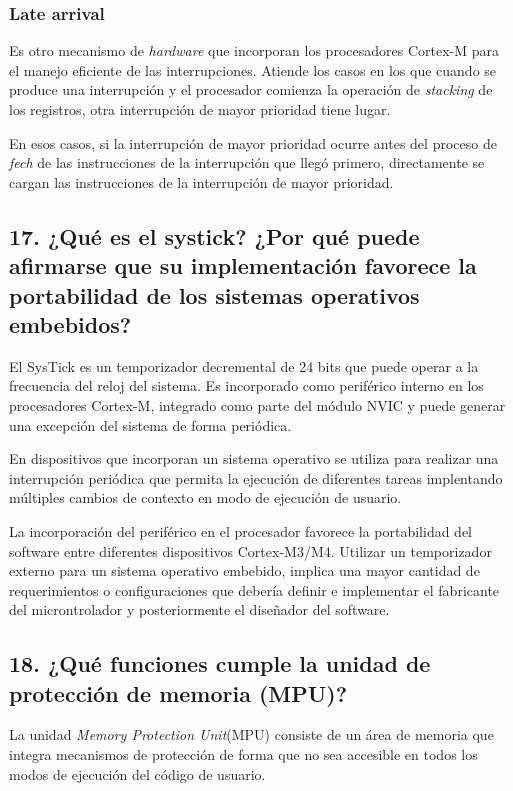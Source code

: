 \documentclass[10pt,a4paper,twoside,spanish]{article}	%
\begin{document}
\subsubsection*{Late arrival} 

Es otro mecanismo de \textit{hardware} que incorporan los procesadores Cortex-M para el manejo eficiente de las interrupciones. 
Atiende los casos en los que cuando se produce una interrupción y el procesador comienza la operación de \textit{stacking} de los registros, otra interrupción de mayor prioridad tiene lugar.

En esos casos, si la interrupción de mayor prioridad ocurre antes del proceso de \textit{fech} de las instrucciones  de la interrupción que llegó primero, directamente se cargan las instrucciones de la interrupción de mayor prioridad.




\subsection*{17. ¿Qué es el systick? ¿Por qué puede afirmarse que su implementación favorece la portabilidad de los sistemas operativos embebidos?}

El SysTick es un temporizador decremental de 24 bits que puede operar a la frecuencia del reloj del sistema. Es incorporado como periférico interno en los procesadores Cortex-M, integrado como parte del módulo NVIC y puede generar una excepción del sistema de forma periódica.

En dispositivos que incorporan un sistema operativo se utiliza para realizar una interrupción periódica que permita la ejecución de diferentes tareas implentando múltiples cambios de contexto en modo de ejecución de usuario. 

La incorporación del periférico en el procesador favorece la portabilidad del software entre diferentes dispositivos Cortex-M3/M4. Utilizar un temporizador externo para un sistema operativo embebido, implica una mayor cantidad de requerimientos o configuraciones que debería definir e implementar el fabricante del microntrolador y posteriormente el diseñador del software.  



\subsection*{18. ¿Qué funciones cumple la unidad de protección de memoria (MPU)?}

La unidad \textit{Memory Protection Unit}(MPU) consiste de un área de memoria que integra mecanismos de protección de forma que no sea accesible en todos los modos de ejecución del código de usuario. 
\end{document}
